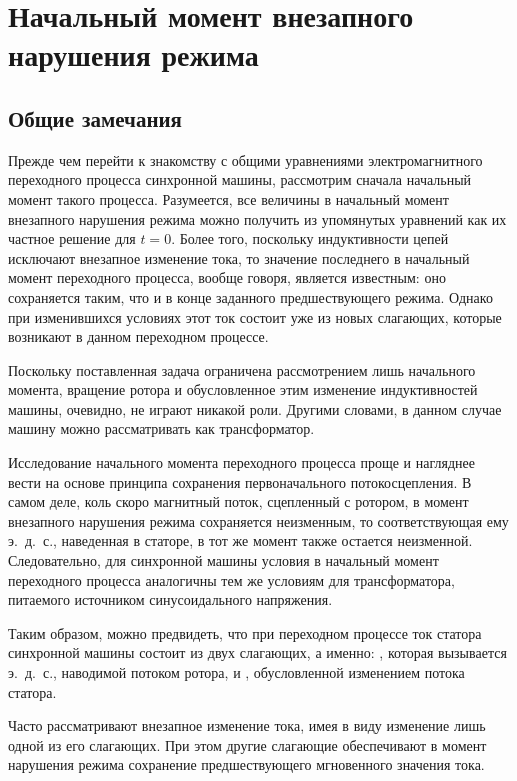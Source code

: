 \chapter{Начальный момент внезапного нарушения режима}
\label{chap:6}

\section{Общие замечания}
\label{sec:6-1}

Прежде чем перейти к знакомству с общими уравнениями электромагнитного переходного процесса синхронной машины, рассмотрим сначала начальный момент такого процесса. Разумеется, все величины в начальный момент внезапного нарушения режима можно получить из упомянутых уравнений как их частное решение для $ t = 0$. Более того, поскольку индуктивности цепей исключают внезапное изменение тока, то значение последнего в начальный момент переходного процесса, вообще говоря, является известным: оно сохраняется таким, что и в конце заданного предшествующего режима. Однако при изменившихся условиях этот ток состоит уже из новых слагающих, которые возникают в данном переходном процессе.

Поскольку поставленная задача ограничена рассмотрением лишь начального момента, вращение ротора и обусловленное этим изменение индуктивностей машины, очевидно, не играют никакой роли. Другими словами, в данном случае машину можно рассматривать как трансформатор.

Исследование начального момента переходного процесса проще и нагляднее вести на основе принципа сохранения первоначального потокосцепления. В самом деле, коль скоро магнитный поток, сцепленный с ротором, в момент внезапного нарушения режима сохраняется неизменным, то соответствующая ему э.~д.~с., наведенная в статоре, в тот же момент также остается неизменной. Следовательно, для синхронной машины условия в начальный момент переходного процесса аналогичны тем же условиям для трансформатора, питаемого источником синусоидального напряжения.

Таким образом, можно предвидеть, что при переходном процессе ток статора синхронной машины состоит из двух слагающих, а именно: , которая вызывается э.~д.~с., наводимой потоком ротора, и , обусловленной изменением потока статора.

Часто рассматривают внезапное изменение тока, имея в виду изменение лишь одной из его слагающих. При этом другие слагающие обеспечивают в момент нарушения режима сохранение предшествующего мгновенного значения тока.

